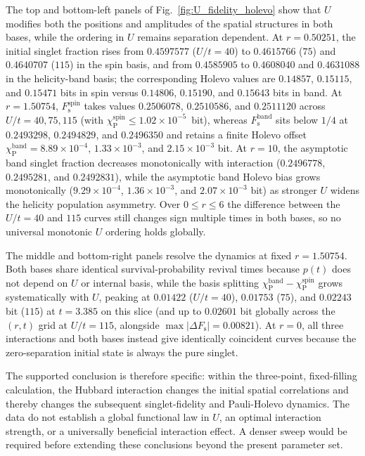 \documentclass[aps,prb,twocolumn,superscriptaddress,longbibliography]{revtex4-2}
\begin{document}
The top and bottom-left panels of Fig.~\ref{fig:U_fidelity_holevo} show that
$U$ modifies both the positions and amplitudes of the spatial structures in
both bases, while the ordering in $U$ remains separation dependent. At
$r=0.50251$, the initial singlet fraction rises from $0.4597577$ ($U/t=40$) to
$0.4615766$ ($75$) and $0.4640707$ ($115$) in the spin basis, and from
$0.4585905$ to $0.4608040$ and $0.4631088$ in the helicity-band basis; the
corresponding Holevo values are $0.14857$, $0.15115$, and $0.15471$ bits in
spin versus $0.14806$, $0.15190$, and $0.15643$ bits in band. At
$r=1.50754$, $F_{\mathrm s}^{\mathrm{spin}}$ takes values $0.2506078$,
$0.2510586$, and $0.2511120$ across $U/t=40,75,115$ (with $\chi_{\mathrm P}^{\mathrm{spin}} \le 1.02\times10^{-5}$~bit),
whereas $F_{\mathrm s}^{\mathrm{band}}$ sits below $1/4$ at $0.2493298$,
$0.2494829$, and $0.2496350$ and retains a finite Holevo offset
$\chi_{\mathrm P}^{\mathrm{band}} = 8.89\times10^{-4}$, $1.33\times10^{-3}$,
and $2.15\times10^{-3}$ bit. At $r=10$, the asymptotic band singlet fraction
decreases monotonically with interaction ($0.2496778$, $0.2495281$, and
$0.2492831$), while the asymptotic band Holevo bias grows monotonically
($9.29\times10^{-4}$, $1.36\times10^{-3}$, and $2.07\times10^{-3}$ bit) as
stronger $U$ widens the helicity population asymmetry. Over $0\leq r\leq6$ the
difference between the $U/t=40$ and $115$ curves still changes sign multiple
times in both bases, so no universal monotonic $U$ ordering holds globally.

The middle and bottom-right panels resolve the dynamics at fixed
$r=1.50754$. Both bases share identical survival-probability revival times
because $p(t)$ does not depend on $U$ or internal basis, while the
basis splitting $\chi_{\mathrm P}^{\mathrm{band}}-\chi_{\mathrm P}^{\mathrm{spin}}$
grows systematically with $U$, peaking at $0.01422$ ($U/t=40$), $0.01753$
($75$), and $0.02243$ bit ($115$) at $t=3.385$ on this slice (and up to
$0.02601$ bit globally across the $(r,t)$ grid at $U/t=115$, alongside
$\max|\Delta F_{\mathrm s}|=0.00821$). At $r=0$, all three interactions and
both bases instead give identically coincident curves because the
zero-separation initial state is always the pure singlet.

The supported conclusion is therefore specific: within the three-point,
fixed-filling calculation, the Hubbard interaction
changes the initial spatial correlations and thereby changes the subsequent
singlet-fidelity and Pauli-Holevo dynamics. The data do not establish a global
functional law in $U$, an optimal interaction strength, or a universally
beneficial interaction effect. A denser sweep would be required before extending these
conclusions beyond the present parameter set.
\end{document}
